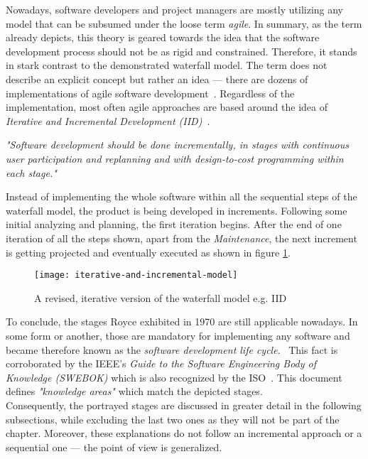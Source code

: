 \documentclass[12pt,a4paper]{report}
\begin{document}
Nowadays, software developers and project managers are mostly utilizing any model that
can be subsumed under the loose term \textit{agile}.
In summary, as the term already depicts, this theory is geared towards
the idea that the software development process should not be as rigid and constrained.
Therefore, it stands in stark contrast to the demonstrated waterfall model.
The term does not describe an explicit concept but rather an idea ---
there are dozens of implementations of agile software development~\cite{martin-agile-practices}.
Regardless of the implementation, most often agile approaches are based around
the idea of \textit{Iterative and Incremental Development (IID)}~\cite{larman-iid-history}.
\begin{displayquote}
\emph{"Software development should be done incrementally, in stages with
continuous user participation and replanning and
with design-to-cost programming within each stage."}~\cite{mills-iid}
\end{displayquote}
Instead of implementing the whole software within all the sequential steps
of the waterfall model, the product is being developed in increments.
Following some initial analyzing and planning, the first iteration begins.
After the end of one iteration of all the steps shown, apart from the \textit{Maintenance},
the next increment is getting projected and eventually executed as shown in figure \ref{fig:idd-model}.
\begin{figure}[htb]
\centering
\texttt{[image: iterative-and-incremental-model]}
\caption{A revised, iterative version of the waterfall model e.g. IID}
\label{fig:idd-model}
\end{figure}\newline
To conclude, the stages Royce exhibited in 1970 are still applicable nowadays.
In some form or another, those are mandatory for implementing any software
and became therefore known as the \textit{software development life cycle}.~\cite{se-ieee}
This fact is corroborated by the IEEE's
\textit{Guide to the Software Engineering Body of Knowledge (SWEBOK)}
which is also recognized by the ISO~\cite{swebok}.
This document defines \textit{"knowledge areas"} which match the depicted stages.\\
Consequently, the portrayed stages are discussed in greater detail in the following subsections,
while excluding the last two ones as they will not be part of the
\textit{} chapter.
Moreover, these explanations do not follow an incremental approach
or a sequential one --- the point of view is generalized.
\end{document}
